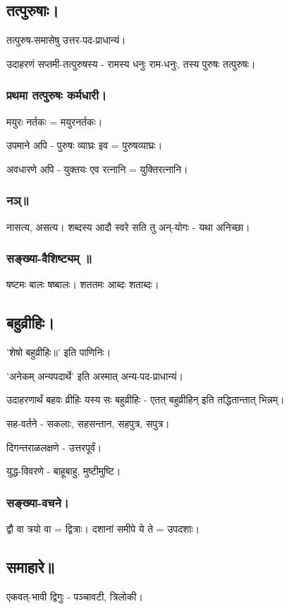 \documentclass[oneside, article]{memoir}
\begin{document}
\subsection{तत्पुरुषाः।}
तत्पुरुष-समासेषु उत्तर-पद-प्राधान्यं।

उदाहरणं सप्तमी-तत्पुरुषस्य - रामस्य धनुः राम-धनुः, तस्य पुरुषः तत्पुरुषः।

\subsubsection{प्रथमा तत्पुरुषः कर्मधारी।}
मयुरः नर्तकः = मयुरनर्तकः।

उपमाने अपि - पुरुषः व्याघ्रः इव = पुरुषव्याघ्रः।

अवधारणे अपि - युक्तयः एव रत्नानि = युक्तिरत्नानि।

\subsubsection{नञ्॥}
नासत्य, असत्य। शब्दस्य आदौ स्वरे सति तु अन्-योगः - यथा अनिच्छा।

\subsubsection{सङ्ख्या-वैशिष्ट्यम् ॥}
षष्टमः बालः षष्बालः। शततमः आब्दः शताब्दः।

\subsection{बहुव्रीहिः।}
'शेषो बहुव्रीहिः॥' इति पाणिनिः।

'अनेकम् अन्यपदार्थे' इति अस्मात् अन्य-पद-प्राधान्यं।

उदाहरणार्थं बहवः व्रीहिः यस्य सः बहुव्रीहिः - एतत् बहुव्रीहिन् इति तद्धितान्तात् भिन्नम्।

सह-वर्तने - सकलाः, सहसन्तान, सहपुत्र, सपुत्र।

दिगन्तराळलक्षणे - उत्तरपूर्वं।

युद्ध-विवरणे - बाहूबाहु, मुष्टीमुष्टि।

\subsubsection{सङ्ख्या-वचने।}
द्वौ वा त्रयो वा = द्वित्राः। दशानां समीपे ये ते = उपदशाः।


\subsection{समाहारे॥}
एकवत्-भावी द्विगुः - पञ्चावटी, त्रिलोकी।
\end{document}
